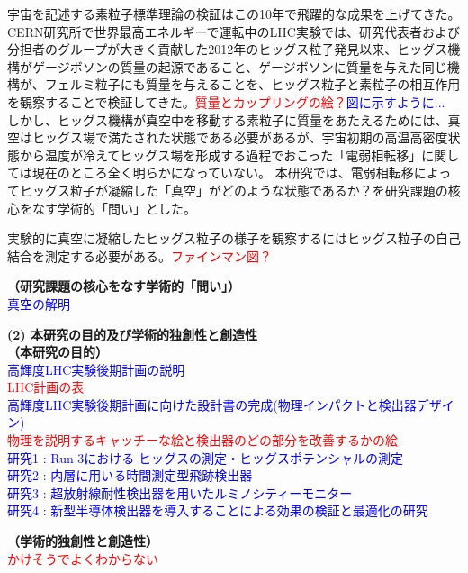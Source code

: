 \documentclass[11pt,a4j,dvipdfmx]{jarticle} 					%
\newcommand{\研究課題名}{新型半導体検出器を用いた真空の解明}
\newcommand{\研究機関名}{高エネルギー加速器研究機構}
\newcommand{\研究代表者氏名}{中村浩二}
\newcommand{\研究期間の最終元号年度}{10}  %
\newcommand{\TODO}[1]{\textcolor{red}{#1}}
\newcommand{\MEMO}[1]{\textcolor{blue}{#1}}
\begin{document}
宇宙を記述する素粒子標準理論の検証はこの10年で飛躍的な成果を上げてきた。CERN研究所で世界最高エネルギーで運転中のLHC実験では、研究代表者および分担者のグループが大きく貢献した2012年のヒッグス粒子発見以来、ヒッグス機構がゲージボソンの質量の起源であること、ゲージボソンに質量を与えた同じ機構が、フェルミ粒子にも質量を与えることを、ヒッグス粒子と素粒子の相互作用を観察することで検証してきた。\TODO{質量とカップリングの絵？}\MEMO{図に示すように...}
しかし、ヒッグス機構が真空中を移動する素粒子に質量をあたえるためには、真空はヒッグス場で満たされた状態である必要があるが、宇宙初期の高温高密度状態から温度が冷えてヒッグス場を形成する過程でおこった「電弱相転移」に関しては現在のところ全く明らかになっていない。
本研究では、電弱相転移によってヒッグス粒子が凝縮した「真空」がどのような状態であるか？を研究課題の核心をなす学術的「問い」とした。

実験的に真空に凝縮したヒッグス粒子の様子を観察するにはヒッグス粒子の自己結合を測定する必要がある。\TODO{ファインマン図？}




\noindent\textbf{（研究課題の核心をなす学術的「問い」）}\\
\MEMO{真空の解明}

\noindent\colorbox[gray]{0.9}{\textbf{(2) 本研究の目的及び学術的独創性と創造性}}\\
\noindent\textbf{（本研究の目的）}\\
\MEMO{
高輝度LHC実験後期計画の説明\\
\TODO{LHC計画の表}\\
高輝度LHC実験後期計画に向けた設計書の完成(物理インパクトと検出器デザイン)\\
\TODO{物理を説明するキャッチーな絵と検出器のどの部分を改善するかの絵}\\
研究1 : Run 3における ヒッグスの測定・ヒッグスポテンシャルの測定\\
研究2 : 内層に用いる時間測定型飛跡検出器\\
研究3 : 超放射線耐性検出器を用いたルミノシティーモニター\\
研究4 : 新型半導体検出器を導入することによる効果の検証と最適化の研究\\
}

\noindent\textbf{（学術的独創性と創造性）}\\
\MEMO{
\TODO{かけそうでよくわからない}\\
}
\end{document}
